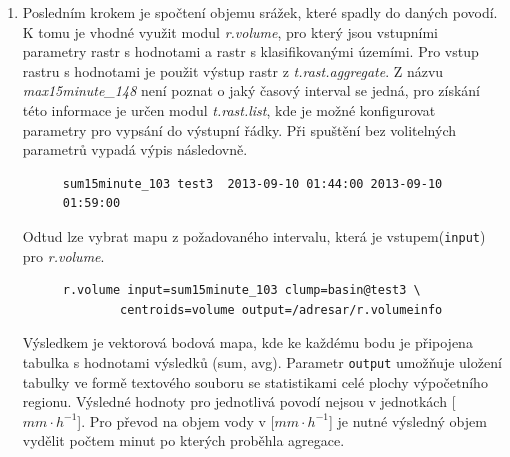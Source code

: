 \documentclass[a4paper,12pt,oneside]{report}
\begin{document}
\begin{enumerate}
\item Posledním krokem je spočtení objemu srážek, které spadly do daných povodí. K tomu je vhodné využit  modul \textit{r.volume}, pro který jsou vstupními parametry rastr s hodnotami a rastr s klasifikovanými územími. Pro vstup rastru s hodnotami je použit výstup  rastr z \textit{t.rast.aggregate}. Z názvu \textit{max15minute\_148} není poznat o jaký časový interval se jedná, pro získání této informace je určen modul \textit{t.rast.list}, kde je možné konfigurovat parametry pro vypsání do výstupní řádky. Při spuštění bez volitelných parametrů vypadá výpis následovně.
\begin{figure}[h!]
\begin{footnotesize}
\lstset{extendedchars=false,
escapeinside=''}
\begin{lstlisting}[style=mybash]
sum15minute_103	test3  2013-09-10 01:44:00 2013-09-10 01:59:00
\end{lstlisting}
\end{footnotesize} 
\end{figure}

Odtud lze vybrat mapu z požadovaného intervalu, která je vstupem(\texttt{input}) pro \textit{r.volume}. 

\begin{figure}[h!]
\begin{footnotesize}
\lstset{extendedchars=false,
escapeinside=''}
\begin{lstlisting}[style=mybash]
r.volume input=sum15minute_103 clump=basin@test3 \
        centroids=volume output=/adresar/r.volumeinfo
\end{lstlisting}
\end{footnotesize} 
\end{figure}

Výsledkem je vektorová bodová mapa, kde ke každému bodu je připojena tabulka s hodnotami výsledků (sum, avg). Parametr \texttt{output} umožňuje uložení tabulky ve formě textového souboru se statistikami celé plochy výpočetního regionu. Výsledné hodnoty pro jednotlivá povodí nejsou v jednotkách  [$mm \cdot h^{-1}$]. Pro převod na objem vody v [$mm \cdot h^{-1}$] je nutné výsledný objem vydělit počtem minut po kterých proběhla agregace.

\end{enumerate} 
\end{document}
